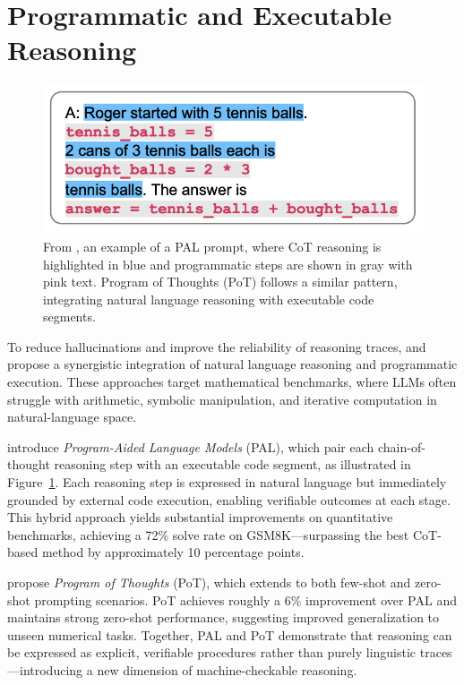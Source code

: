 \documentclass[project]{bsu-cs}  %
\begin{document}
\section{Programmatic and Executable Reasoning}\label{sec:programmatic}
%
\begin{figure}
    \centering
    \includegraphics[width=0.8\linewidth]{figures/pal1.png}
    \caption{From \citet{gao2023palprogramaidedlanguagemodels}, an example of a PAL prompt, where CoT reasoning is highlighted in blue and programmatic steps are shown in gray with pink text. Program of Thoughts (PoT) follows a similar pattern, integrating natural language reasoning with executable code segments.}
    \label{fig:pal1}
\end{figure}
% 
To reduce hallucinations and improve the reliability of reasoning traces, \citet{gao2023palprogramaidedlanguagemodels} and \citet{chen2023programthoughtspromptingdisentangling} propose a synergistic integration of natural language reasoning and programmatic execution. These approaches target mathematical benchmarks, where LLMs often struggle with arithmetic, symbolic manipulation, and iterative computation in natural-language space. 

\citet{gao2023palprogramaidedlanguagemodels} introduce \textit{Program-Aided Language Models} (PAL), which pair each chain-of-thought reasoning step with an executable code segment, as illustrated in Figure~\ref{fig:pal1}. Each reasoning step is expressed in natural language but immediately grounded by external code execution, enabling verifiable outcomes at each stage. This hybrid approach yields substantial improvements on quantitative benchmarks, achieving a 72\% solve rate on GSM8K—surpassing the best CoT-based method by approximately 10 percentage points.

\citet{chen2023programthoughtspromptingdisentangling} propose \textit{Program of Thoughts} (PoT), which extends to both few-shot and zero-shot prompting scenarios. PoT achieves roughly a 6\% improvement over PAL and maintains strong zero-shot performance, suggesting improved generalization to unseen numerical tasks. Together, PAL and PoT demonstrate that reasoning can be expressed as explicit, verifiable procedures rather than purely linguistic traces—introducing a new dimension of machine-checkable reasoning.
\end{document}
